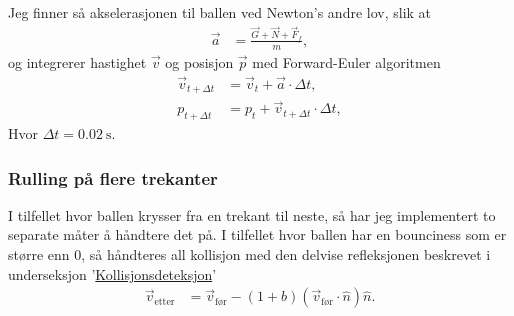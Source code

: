 \documentclass[norsk, doc, 11pt, a4paper]{apa7}  %
\begin{document}
Jeg finner så akselerasjonen til ballen ved Newton's andre lov, slik at
\begin{align*}
	\vec{a} &= \frac{\vec{G}+\vec{N}+\vec{F}_{f}}{m},
\end{align*}
og integrerer hastighet \(\vec{v}\) og posisjon \(\vec{p}\) med Forward-Euler algoritmen
\begin{align*}
	\vec{v}_{t+\Delta t} &= \vec{v}_{t} + \vec{a}\cdot\Delta t, \\
	p_{t+\Delta t} &= p_{t} + \vec{v}_{t+\Delta t}\cdot \Delta t,
\end{align*}
Hvor \(\Delta t = \SI{0.02}{\second}\).

\subsubsection{Rulling på flere trekanter}
I tilfellet hvor ballen krysser fra en trekant til neste, så har jeg implementert to separate måter å håndtere det på. I tilfellet hvor ballen har en bounciness som er større enn \(0\), så håndteres all kollisjon med den delvise refleksjonen beskrevet i underseksjon '\hyperref[sec:3:A]{Kollisjonsdeteksjon}'
\begin{align*}
	\vec{v}_{\text{etter}} &= \vec{v}_{\text{før}} - \left(1+b\right)\left(\vec{v}_{\text{før}}\cdot\hat{n}\right)\hat{n}.
\end{align*}
\end{document}
